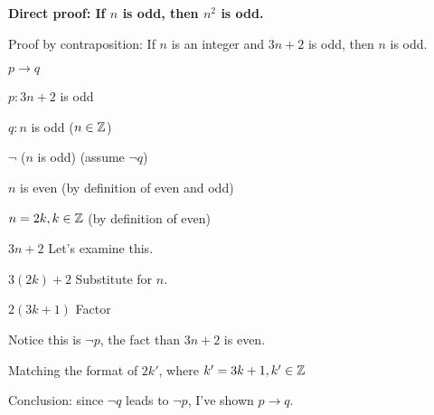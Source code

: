 \documentclass{exam}
\begin{document}
	\textbf{Direct proof: If $n$ is odd, then $n^2$ is odd.}
	
	Proof by contraposition: If $n$ is an integer and $3n+2$ is odd, then $n$ is odd.
	
	$p \rightarrow q$
	
	$p: 3n+2$ is odd
	
	$q: n$ is odd ($n \in {\Bbb Z}$)
	
	$\neg$ ($n$ is odd) (assume $\neg q$)
	
	$n$ is even (by definition of even and odd)
	
	$n = 2k, k \in {\Bbb Z}$ (by definition of even)
	
	$3n+2$ Let's examine this.
	
	$3(2k) + 2$ Substitute for $n$.
	
	$2(3k+1)$ Factor
	
	Notice this is $\neg p$, the fact than $3n+2$ is even.
	
	Matching the format of $2k'$, where $k' = 3k+1, k' \in \Bbb Z$
	
	Conclusion: since $\neg q$ leads to $\neg p$, I've shown $p \rightarrow q$.
	
\end{document}
